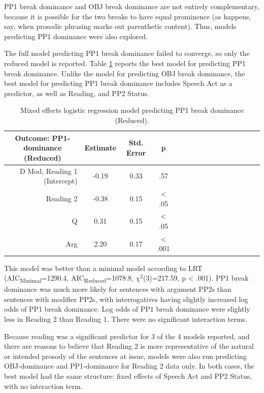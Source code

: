 \documentclass[11pt,oneside]{book}
\begin{document}
PP1 break dominance and OBJ break dominance are not entirely complementary, because it is possible for the two breaks to have equal prominence (as happens, say, when prosodic
phrasing marks out parenthetic content). Thus, models predicting PP1 dominance were also explored.

The full model predicting PP1 break dominance failed to converge, so only the reduced model is reported. Table \ref{tab:pdom} reports the best model for predicting PP1 break dominance. Unlike the model for predicting OBJ break dominance, the best model for predicting PP1 break dominance includes Speech Act as a predictor, as well as Reading, and PP2 Status.

\begin{table}[!h]

\caption{\label{tab:pdom}Mixed effects logistic regression model predicting PP1 break dominance (Reduced).}
\centering
\begin{tabular}{rcccrcccrcccrccc}
\toprule
\multicolumn{1}{c}{Outcome: PP1-dominance (Reduced)} & \multicolumn{1}{c}{Estimate} & \multicolumn{1}{c}{Std. Error} & \multicolumn{1}{c}{p}\\
\midrule
D Mod, Reading 1 (Intercept) & -0.19 & 0.33 & .57\\
Reading 2 & -0.38 & 0.15 & < .05\\
Q & 0.31 & 0.15 & < .05\\
Arg & 2.20 & 0.17 & < .001\\
\bottomrule
\end{tabular}
\end{table}

This model was better than a minimal model according to LRT (AIC\textsubscript{Minimal}=1290.4, AIC\textsubscript{Reduced}=1078.8, \(\chi^2\)(3)=217.59, p \textless{} .001). PP1 break dominance was much more likely for sentences with argument PP2s than sentences with modifier PP2s, with interrogatives having slightly increased log odds of PP1 break dominance. Log odds of PP1 break dominance were slightly less in Reading 2 than Reading 1. There were no significant interaction terms.

Because reading was a significant predictor for 3 of the 4 models reported, and there are reasons to believe that Reading 2 is more representative of the natural or intended prosody of the sentences at issue, models were also run predicting OBJ-dominance and PP1-dominance for Reading 2 data only. In both cases, the best model had the same structure: fixed effects of Speech Act and PP2 Status, with no interaction term.
\end{document}
